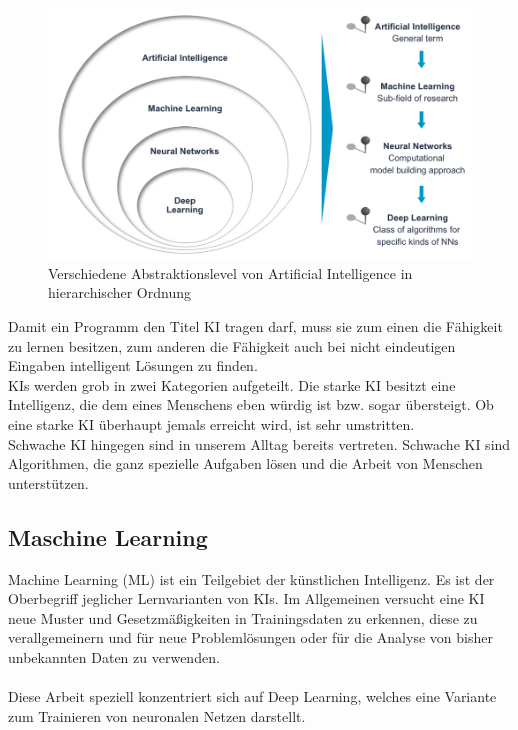 \documentclass[12pt,oneside,a4paper,parskip]{scrbook}
\begin{document}
\begin{figure}[ht]
	\begin{center}
		\includegraphics[width=14cm]{Bilder/Abstraktionslevel_von_AI.jpg}
		\caption{Verschiedene Abstraktionslevel von Artificial Intelligence in hierarchischer Ordnung}
		\label{fig:Uebersicht}
	\end{center}
\end{figure}
Damit ein Programm den Titel KI tragen darf, muss sie zum einen die Fähigkeit zu lernen besitzen, zum anderen die Fähigkeit auch bei nicht eindeutigen Eingaben intelligent Lösungen zu finden.\\
KIs werden grob in zwei Kategorien aufgeteilt.
Die starke KI besitzt eine Intelligenz, die dem eines Menschens eben würdig ist bzw. sogar übersteigt. Ob eine starke KI überhaupt jemals erreicht wird, ist sehr umstritten. \\Schwache KI hingegen sind in unserem Alltag bereits vertreten. Schwache KI sind Algorithmen, die ganz spezielle Aufgaben lösen und die Arbeit von Menschen unterstützen.
\subsection{Maschine Learning}
Machine Learning (ML) ist ein Teilgebiet der künstlichen Intelligenz. Es ist der Oberbegriff jeglicher Lernvarianten von KIs. Im Allgemeinen versucht eine KI neue Muster und Gesetzmäßigkeiten in Trainingsdaten zu erkennen, diese zu verallgemeinern und für neue Problemlösungen oder für die Analyse von bisher unbekannten Daten zu verwenden\cite{EliminateHumanBias}.
\\\\Diese Arbeit speziell konzentriert sich auf Deep Learning, welches eine Variante zum Trainieren von neuronalen Netzen darstellt.
\end{document}
